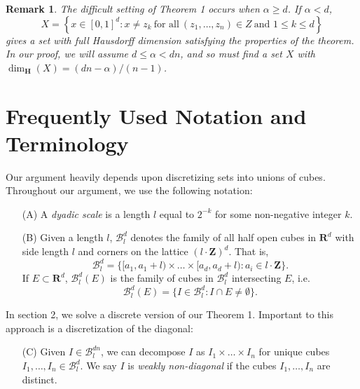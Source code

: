 \documentclass[dvipsnames]{article}
\theoremstyle{plain}
\theoremstyle{plain}
\newtheorem*{remark}{Remark}
\begin{document}
\begin{remark}
	The difficult setting of Theorem 1 occurs when $\alpha \geq d$. If $\alpha < d$,
	\[ X = \left\{ x \in [0,1]^d : x \neq z_k\ \text{for all}\ (z_1, \dots, z_n) \in Z\ \text{and $1 \leq k \leq d$} \right\} \]
	gives a set with full Hausdorff dimension satisfying the properties of the theorem. In our proof, we will assume $d \leq \alpha < dn$, and so must find a set $X$ with $\dim_{\mathbf{H}}(X) = (dn - \alpha) / (n-1)$.
\end{remark}









\section{Frequently Used Notation and Terminology}

Our argument heavily depends upon discretizing sets into unions of cubes. Throughout our argument, we use the following notation:

\begin{enumerate}
	\item[(A)] A {\it dyadic scale} is a length $l$ equal to $2^{-k}$ for some non-negative integer $k$.

	\item[(B)] Given a length $l$, $\mathcal{B}^d_l$ denotes the family of all half open cubes in $\mathbf{R}^d$ with side length $l$ and corners on the lattice $(l \cdot \mathbf{Z})^d$. That is,
	\[ \mathcal{B}^d_l = \{ [a_1,a_1 + l) \times \dots \times [a_d, a_d + l) : a_i \in l \cdot \mathbf{Z} \}. \]
	If $E \subset \mathbf{R}^d$, $\mathcal{B}^d_l(E)$ is the family of cubes in $\mathcal{B}^d_l$ intersecting $E$, i.e.
	\[\mathcal{B}^d_l(E) = \{ I \in \mathcal{B}^d_l: I \cap E \neq \emptyset \}. \]
\end{enumerate}

In section 2, we solve a discrete version of our Theorem 1. Important to this approach is a discretization of the diagonal:

\begin{enumerate}
	\item[(C)] Given $I \in \mathcal{B}^{dn}_l$, we can decompose $I$ as $I_1 \times \dots \times I_n$ for unique cubes $I_1, \dots, I_n \in \mathcal{B}^d_l$. We say $I$ is {\it weakly non-diagonal} if the cubes $I_1, \dots, I_n$ are distinct. 
\end{enumerate}
\end{document}
